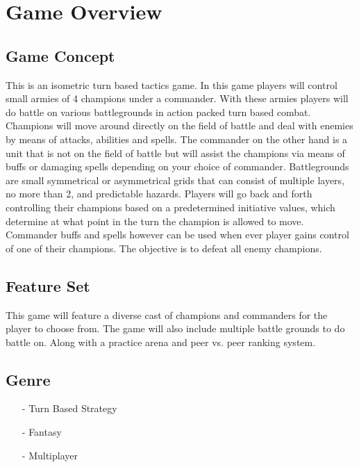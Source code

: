 
\section{Game Overview}

\subsection{Game Concept}
    \begin{adjustwidth}{1.5em}{0pt}
    This is an isometric turn based tactics game. In this game players will control small armies of 4 champions under a commander. With these armies players will do battle on various battlegrounds in action packed turn based combat. Champions will move around directly on the field of battle and deal with enemies by means of attacks, abilities and spells. The commander on the other hand is a unit that is not on the field of battle but will assist the champions via means of buffs or damaging spells depending on your choice of commander. Battlegrounds are small symmetrical or asymmetrical grids that can consist of multiple layers, no more than 2, and predictable hazards. Players will go back and forth controlling their champions based on a predetermined initiative values, which determine at what point in the turn the champion is allowed to move. Commander buffs and spells however can be used when ever player gains control of one of their champions. The objective is to defeat all enemy champions.
    \end{adjustwidth}

\subsection{Feature Set}
    \begin{adjustwidth}{1.5em}{0pt}
    This game will feature a diverse cast of champions and commanders for the player to choose from. The game will also include multiple battle grounds to do battle on. Along with a practice arena and peer vs. peer ranking system.
    \end{adjustwidth}

\subsection{Genre}
    \begin{itemize}
        \item [-] Turn Based Strategy
        \item [-] Fantasy
        \item [-] Multiplayer
    \end{itemize}

